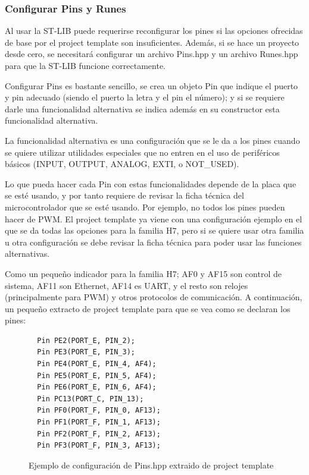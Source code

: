 \documentclass{report}
\begin{document}
\subsubsection{Configurar Pins y Runes}
Al usar la ST-LIB puede requerirse reconfigurar los pines si las opciones ofrecidas de base por el project template son insuficientes. Además, si se hace un proyecto desde cero, se necesitará configurar un archivo Pins.hpp y un archivo Runes.hpp para que la ST-LIB funcione correctamente. 
\par \vspace{0.3cm}
Configurar Pins es bastante sencillo, se crea un objeto Pin que indique el puerto y pin adecuado (siendo el puerto la letra y el pin el número); y si se requiere darle una funcionalidad alternativa se indica además en su constructor esta funcionalidad alternativa. 
\par
La funcionalidad alternativa es una configuración que se le da a los pines cuando se quiere utilizar utilidades especiales que no entren en el uso de periféricos básicos (INPUT, OUTPUT, ANALOG, EXTI, o NOT\_USED). 
\par
Lo que pueda hacer cada Pin con estas funcionalidades depende de la placa que se esté usando, y por tanto requiere de revisar la ficha técnica del microcontrolador que se esté usando. Por ejemplo, no todos los pines pueden hacer de PWM. El project template ya viene con una configuración ejemplo en el que se da todas las opciones para la familia H7, pero si se quiere usar otra familia u otra configuración se debe revisar la ficha técnica para poder usar las funciones alternativas. \par \vspace{0.3cm}
Como un pequeño indicador para la familia H7; AF0 y AF15 son control de sistema, AF11 son Ethernet, AF14 es UART, y el resto son relojes (principalmente para PWM) y otros protocolos de comunicación. A continuación, un pequeño extracto de project template para que se vea como se declaran los pines: 
\begin{figure}[h]
\begin{lstlisting}
  Pin PE2(PORT_E, PIN_2);
  Pin PE3(PORT_E, PIN_3);
  Pin PE4(PORT_E, PIN_4, AF4);
  Pin PE5(PORT_E, PIN_5, AF4);
  Pin PE6(PORT_E, PIN_6, AF4);
  Pin PC13(PORT_C, PIN_13);
  Pin PF0(PORT_F, PIN_0, AF13);
  Pin PF1(PORT_F, PIN_1, AF13);
  Pin PF2(PORT_F, PIN_2, AF13);
  Pin PF3(PORT_F, PIN_3, AF13);
\end{lstlisting}
\caption{Ejemplo de configuración de Pins.hpp extraido de project template}
  \label{PinsConfFile}
\end{figure}
\end{document}
